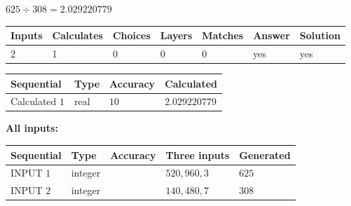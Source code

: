 \documentclass{ctexart}
\begin{document}
 

 
 
 
\noindent{}
 
 

$ %
625 \div  %
308=   %
2.029220779$
 
 
\noindent{}
 
 

 
   
   
   
   
\noindent\begin{tabular}{|l|l|l|l|l|l|l|}
 \hline
Inputs & Calculates & Choices & Layers & Matches & Answer & Solution \\ \hline
 2  & 
 1  & 
 0
  & 
 0  & 
 0  & 
  yes & 
  yes 
  \\ \hline
 \end{tabular}
   
   
   
   
\noindent{}
   
   
  
  
\noindent\begin{tabular}{|l|l|l|l|}
\hline
 Sequential & Type & Accuracy & Calculated \\ 
\hline
 
 
  Calculated $  1 $ & real & $  10  $ & 
 $ 2.029220779 $ 
 \\  \hline  
 \end{tabular}
   
   
   
   
\noindent\vspace{0.1in}\hspace{-0.08in} {\textbf{\Large{All inputs: }}}
   
   
  
  
\noindent\begin{tabular}{|l|l|l|l|l|}
\hline
 Sequential & Type & Accuracy & Three inputs & Generated \\ 
\hline
 
 
  INPUT $  1 $ & integer &  & $
 520
 , 
 960
 , 
 3
 $ & $ 625 $ 
 \\  \hline  
 
 
  INPUT $  2 $ & integer &  & $
 140
 , 
 480
 , 
 7
 $ & $ 308 $ 
 \\  \hline  
 \end{tabular}
   
\end{document}
